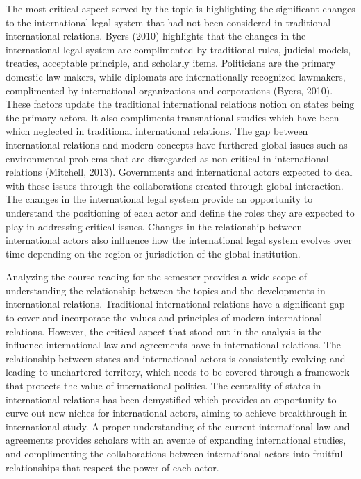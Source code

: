 \documentclass[11pt]{article}
\begin{document}
The most critical aspect served by the topic is highlighting the significant changes to the international legal system that had not been considered in traditional international relations. Byers (2010) highlights that the changes in the international legal system are complimented by traditional rules, judicial models, treaties, acceptable principle, and scholarly items. Politicians are the primary domestic law makers, while diplomats are internationally recognized lawmakers, complimented by international organizations and corporations (Byers, 2010). These factors update the traditional international relations notion on states being the primary actors. It also compliments transnational studies which have been which neglected in traditional international relations. The gap between international relations and modern concepts have furthered global issues such as environmental problems that are disregarded as non-critical in international relations (Mitchell, 2013). Governments and international actors expected to deal with these issues through the collaborations created through global interaction. The changes in the international legal system provide an opportunity to understand the positioning of each actor and define the roles they are expected to play in addressing critical issues. Changes in the relationship between international actors also influence how the international legal system evolves over time depending on the region or jurisdiction of the global institution.

Analyzing the course reading for the semester provides a wide scope of understanding the relationship between the topics and the developments in international relations. Traditional international relations have a significant gap to cover and incorporate the values and principles of modern international relations. However, the critical aspect that stood out in the analysis is the influence international law and agreements have in international relations. The relationship between states and international actors is consistently evolving and leading to unchartered territory, which needs to be covered through a framework that protects the value of international politics. The centrality of states in international relations has been demystified which provides an opportunity to curve out new niches for international actors, aiming to achieve breakthrough in international study. A proper understanding of the current international law and agreements provides scholars with an avenue of expanding international studies, and complimenting the collaborations between international actors into fruitful relationships that respect the power of each actor.
\end{document}

